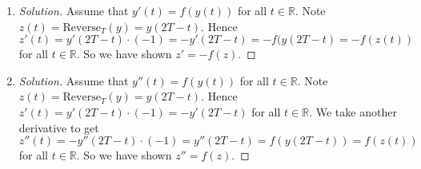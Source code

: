 \documentclass{article}
\newcommand{\R}{{\mathbb R}}
\begin{document}
\begin{enumerate}
\begin{proof}[Solution]
\begin{align*}
			&\implies z = e^{A(t+C)}
		\end{align*}
		Hence, $z = y(t+C)$ and so $z$ is a translation of $y$ by $-C$,
		i.e. $z = \mathrm{Trans}_{-C}(y)$.
	\end{proof}
	\item \begin{proof}[Solution]\let\qed\relax
		Assume that $y'(t) = f(y(t))$ for all $t \in \R$.
		Note $z(t) = \mathrm{Reverse}_T(y) = y(2T-t)$.
		Hence $z'(t) = y'(2T-t)\cdot(-1) = -y'(2T-t) = -f(y(2T-t) = -f(z(t))$
		for all $t \in \R$.
		So we have shown $z' = -f(z)$.
	\end{proof}
	\item \begin{proof}[Solution]\let\qed\relax
		Assume that $y''(t) = f(y(t))$ for all $t \in \R$.
		Note $z(t) = \mathrm{Reverse}_T(y) = y(2T-t)$.
		Hence $z'(t) = y'(2T-t)\cdot(-1) = -y'(2T-t)$
		for all $t \in \R$.
		We take another derivative to get
		$z''(t) = -y''(2T-t)\cdot(-1) = y''(2T-t) = f(y(2T-t)) = f(z(t))$
		for all $t \in \R$.
		So we have shown $z'' = f(z)$.
	\end{proof}
\end{enumerate}
\end{document}
